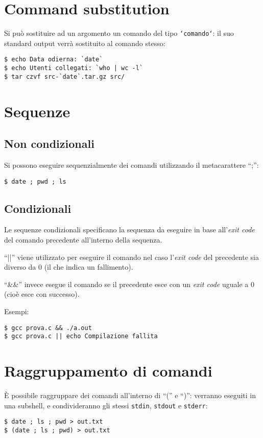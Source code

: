 \section{Command substitution}
Si pu\`o sostituire ad un argomento un comando del tipo
\texttt{`comando`}: il suo standard output verr\`a sostituito al comando
stesso:
\begin{verbatim}
$ echo Data odierna: `date`
$ echo Utenti collegati: `who | wc -l`
$ tar czvf src-`date`.tar.gz src/
\end{verbatim}

\section{Sequenze}
\subsection*{Non condizionali}
Si possono eseguire sequenzialmente dei comandi utilizzando il metacarattere
``;'':
\begin{verbatim}
$ date ; pwd ; ls
\end{verbatim}

\subsection*{Condizionali}
Le sequenze condizionali specificano la sequenza da eseguire in base
all'\emph{exit code} del comando precedente all'interno della sequenza.

``||'' viene utilizzato per eseguire il comando nel caso l'\emph{exit code}
del precedente sia diverso da 0 (il che indica un fallimento).

``\&\&'' invece esegue il comando se il precedente esce con un \emph{exit
code} uguale a 0 (cio\`e esce con successo).

Esempi:
\begin{verbatim}
$ gcc prova.c && ./a.out
$ gcc prova.c || echo Compilazione fallita
\end{verbatim}

\section{Raggruppamento di comandi}
\label{sec:sub:raggr}
\`E possibile raggruppare dei comandi all'interno di ``('' e ``)'': verranno
eseguiti in una subshell, e condivideranno gli stessi \texttt{stdin},
\texttt{stdout} e \texttt{stderr}:
\begin{verbatim}
$ date ; ls ; pwd > out.txt
$ (date ; ls ; pwd) > out.txt
\end{verbatim}

